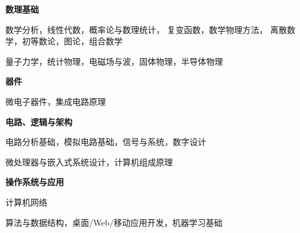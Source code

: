 
\newcommand{\levelentry}[1]{\item \textbf{#1}}
\newenvironment{cvcourses}
{
    \begin{cvlist}\item
    \small
}
{
    \normalsize
    \end{cvlist}
}

\begin{cvlist}
    \levelentry{数理基础}
    \begin{cvcourses}
        数学分析，线性代数，概率论与数理统计，
        复变函数，数学物理方法，
        离散数学，初等数论，图论，组合数学
    \end{cvcourses}
    \begin{cvcourses}
        量子力学，统计物理，电磁场与波，固体物理，半导体物理
    \end{cvcourses}
    
    \levelentry{器件}
    \begin{cvcourses}
        微电子器件，集成电路原理
    \end{cvcourses}

    \levelentry{电路、逻辑与架构}
    \begin{cvcourses}
        电路分析基础，模拟电路基础，信号与系统，数字设计
    \end{cvcourses}
    \begin{cvcourses}
        微处理器与嵌入式系统设计，计算机组成原理
    \end{cvcourses}

    \levelentry{操作系统与应用}
    \begin{cvcourses}
        计算机网络
    \end{cvcourses}
    \begin{cvcourses}
        算法与数据结构，桌面/Web/移动应用开发，机器学习基础
    \end{cvcourses}

\end{cvlist}

\endinput